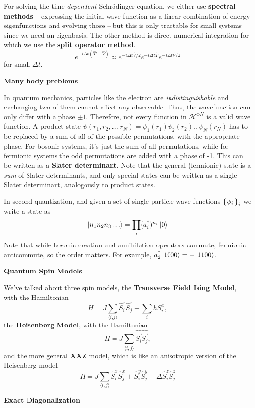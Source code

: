 \documentclass[10pt,landscape]{article}
\newcommand{\topiccolor}{green}
\newcommand{\topic}[2]{%
	\renewcommand{\topiccolor}{#1}
	\begin{tcolorbox}[boxsep=0.5mm, left=1mm, right=1mm, top=0mm, bottom=0mm,
		colback=#1!30, colframe=#1, arc is angular]%
		\centering \textbf{#2}%
	\end{tcolorbox}%
}
\newcommand{\cbf}[1]{\textcolor{\topiccolor!80!black}{\textbf{#1}}}
\begin{document}
\begin{multicols*}{3}
For solving the time-\emph{dependent} Schrödinger equation, we either use
\cbf{spectral methods} -- expressing the initial wave function as a linear combination
of energy eigenfunctions and evolving those -- but this is only tractable for
small systems since we need an eigenbasis. The other method is direct numerical
integration for which we use the \cbf{split operator method}.
\[
	e^{-i\Delta t(\hat T + \hat V)} \approx 
	e^{-i \Delta t \hat V / 2} e^{-i \Delta t \hat T} e^{-i \Delta t \hat V / 2}
\]
for small $\Delta t$.

\topic{green}{Many-body problems}

In quantum mechanics, particles like the electron are \emph{indistinguishable}
and exchanging two of them cannot affect any observable. Thus, the wavefunction
can only differ with a phase $\pm1$.
Therefore, not every function in $\mathcal H^{\otimes N}$ is a valid wave
function.
A product state 
$\psi(r_1, r_2, \ldots, r_N) = \psi_1(r_1) \psi_2(r_2) \ldots \psi_N(r_N)$
has to be replaced by a sum of all of the possible permutations, with the
appropriate phase. For bosonic systems, it's just the sum of all permutations,
while for fermionic systems the odd permutations are added with a phase of -1.
This can be written as a \cbf{Slater determinant}.
Note that the general (fermionic) state is a \emph{sum} of Slater determinants,
and only special states can be written as a single Slater determinant,
analogously to product states.

In second quantization, and given a set of single particle wave functions
$\set{\phi_i}_i$ we write a state as
\[
	\ket{n_1 n_2 n_3 \ldots} = \prod_i (a_i^\dagger)^{n_i} \ket 0
\]
Note that while bosonic creation and annihilation operators commute, fermionic
anticommute, so the order matters. For example, 
$a_2^\dagger\ket{1000} = -\ket{1100}$.

\topic{olive}{Quantum Spin Models}

We've talked about three spin models,
the \cbf{Transverse Field Ising Model}, with the Hamiltonian
\[
	H = J\sum_{\langle i,j \rangle} \hat S_i^z \hat S_j^z + \sum_i h S_i^x,
\]
the \cbf{Heisenberg Model}, with the Hamiltonian
\[
	H = J\sum_{\langle i,j \rangle} \hat{\vec{S_i}} \hat{\vec{S_j}},
\]
and the more general \cbf{XXZ} model, which is like an anisotropic version of
the Heisenberg model,
\[
	H = J\sum_{\langle i,j \rangle}  \hat S_i^x \hat S_j^x + \hat S_i^y \hat
	S_j^y + \Delta \hat S_i^z \hat S_j^z
\]

\topic{lime}{Exact Diagonalization}


\end{multicols*}
\end{document}
